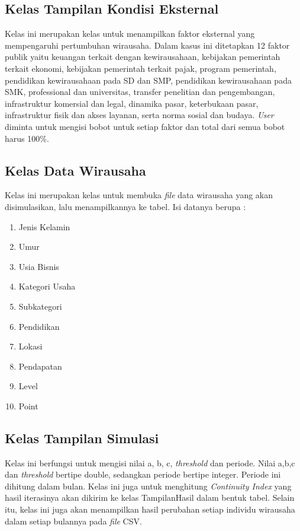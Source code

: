 \subsection{Kelas Tampilan Kondisi Eksternal}
Kelas ini merupakan kelas untuk menampilkan faktor eksternal yang mempengaruhi pertumbuhan wirausaha. Dalam kasus ini ditetapkan 12 faktor publik yaitu keuangan terkait dengan kewirausahaan, kebijakan pemerintah terkait ekonomi, kebijakan pemerintah terkait pajak, program pemerintah, pendidikan kewirausahaan pada SD dan SMP, pendidikan kewirausahaan pada SMK, professional dan universitas, transfer penelitian dan pengembangan, infrastruktur komersial dan legal, dinamika pasar, keterbukaan pasar, infrastruktur fisik dan akses layanan, serta norma sosial dan budaya. \textit{User} diminta untuk mengisi bobot untuk setiap faktor dan total dari semua bobot harus 100\%.

\subsection{Kelas Data Wirausaha}
Kelas ini merupakan kelas untuk membuka \textit{file} data wirausaha yang akan disimulasikan, lalu menampilkannya ke tabel. Isi datanya berupa :
\begin{enumerate}
	\item Jenis Kelamin
	\item Umur
	\item Usia Bisnis
	\item Kategori Usaha
	\item Subkategori
	\item Pendidikan
	\item Lokasi
	\item Pendapatan
	\item Level
	\item Point
\end{enumerate}

\subsection{Kelas Tampilan Simulasi}
Kelas ini berfungsi untuk mengisi nilai a, b, c, \textit{threshold} dan periode. Nilai a,b,c dan \textit{threshold} bertipe double, sedangkan periode bertipe integer. Periode ini dihitung dalam bulan. Kelas ini juga untuk menghitung \textit{Continuity Index} yang hasil iterasinya akan dikirim ke kelas TampilanHasil dalam bentuk tabel. Selain itu, kelas ini juga akan menampilkan hasil perubahan setiap individu wirausaha dalam setiap bulannya pada \textit{file} CSV.

